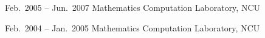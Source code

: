 \documentclass[10pt]{article} %
\begin{document}
\begin{paracol}{2}

  {Feb.~2005 -- Jun.~2007} %
  {Mathematics Computation Laboratory, NCU} %
  {}



  {Feb.~2004 -- Jan.~2005} %
  {Mathematics Computation Laboratory, NCU} %
  {}


  \switchcolumn %



\end{paracol}
\end{document}
